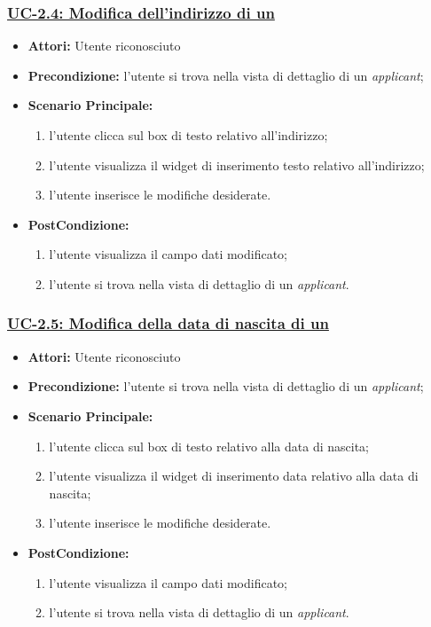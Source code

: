 \subsubsection{\underline{UC-2.4: Modifica dell'indirizzo di un \applicant}}
\begin{itemize}
	\item \textbf{Attori:} Utente riconosciuto
	\item \textbf{Precondizione:}  l'utente si trova nella vista di dettaglio di un \textit{applicant};
	\item \textbf{Scenario Principale:}
	\begin{enumerate}
		\item l'utente clicca sul box di testo relativo all'indirizzo;
		\item l'utente visualizza il  widget di inserimento testo relativo all'indirizzo;
		\item l'utente inserisce le modifiche desiderate.
	\end{enumerate}
	\item \textbf{PostCondizione:} 
	\begin{enumerate}
		\item l'utente visualizza il campo dati modificato;
		\item l'utente si trova nella vista di dettaglio di un \textit{applicant}.
	\end{enumerate}
	
\end{itemize}

\subsubsection{\underline{UC-2.5: Modifica della data di nascita di un \applicant}}
\begin{itemize}
	\item \textbf{Attori:} Utente riconosciuto
	\item \textbf{Precondizione:}  l'utente si trova nella vista di dettaglio di un \textit{applicant};
	\item \textbf{Scenario Principale:}
	\begin{enumerate}
		\item l'utente clicca sul box di testo relativo alla data di nascita;
		\item l'utente visualizza il  widget di inserimento data relativo alla data di nascita;
		\item l'utente inserisce le modifiche desiderate.
	\end{enumerate}
	\item \textbf{PostCondizione:} 
	\begin{enumerate}
		\item l'utente visualizza il campo dati modificato;
		\item l'utente si trova nella vista di dettaglio di un \textit{applicant}.
	\end{enumerate}
	
\end{itemize}


